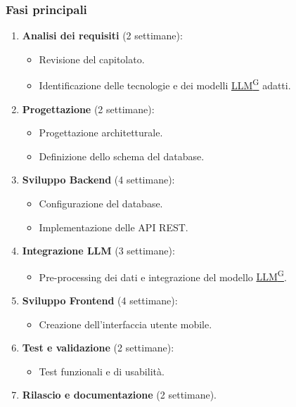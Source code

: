 \documentclass{article}
\begin{document}
                \subsubsection{Fasi principali}  %
                \begin{enumerate}
                    \item \textbf{Analisi dei requisiti} (2 settimane):
                    \begin{itemize}
                        \item Revisione del capitolato.
                        \item Identificazione delle tecnologie e dei modelli \href{https://code7crusaders.github.io/docs/PB/documentazione_interna/glossario.html#llm-large-language-model}{LLM\textsuperscript{G}} adatti.
                    \end{itemize}
                    \item \textbf{Progettazione} (2 settimane):
                    \begin{itemize}
                        \item Progettazione architetturale.
                        \item Definizione dello schema del database.
                    \end{itemize}
                    \item \textbf {Sviluppo Backend} (4 settimane):
                    \begin{itemize}
                        \item Configurazione del database.
                        \item Implementazione delle API REST.
                    \end{itemize}
                    \item \textbf{Integrazione LLM} (3 settimane):
                    \begin{itemize}
                        \item Pre-processing dei dati e integrazione del modello \href{https://code7crusaders.github.io/docs/PB/documentazione_interna/glossario.html#llm-large-language-model}{LLM\textsuperscript{G}}.
                    \end{itemize}
                    \item \textbf{Sviluppo Frontend} (4 settimane):
                    \begin{itemize}
                        \item Creazione dell'interfaccia utente mobile.
                    \end{itemize}
                    \item \textbf{Test e validazione} (2 settimane):
                    \begin{itemize}
                        \item Test funzionali e di usabilità.
                    \end{itemize}
                    \item \textbf{Rilascio e documentazione} (2 settimane).
                \end{enumerate}
        
\end{document}
